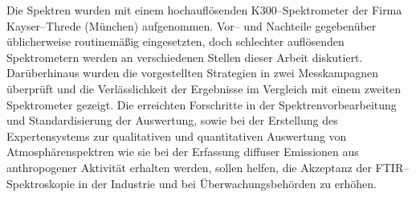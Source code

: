 Die Spektren wurden mit einem hochaufl\"{o}senden K300--Spektrometer
der Firma Kayser--Threde (M\"{u}nchen) aufgenommen. Vor-- und
Nachteile gegeben\"{u}ber \"{u}blicherweise routinem\"{a}{\ss}ig eingesetzten,
doch schlechter aufl\"{o}senden Spektrometern werden an verschiedenen
Stellen dieser Arbeit diskutiert. Dar\"{u}berhinaus wurden die
vorgestellten Strategien in zwei Messkampagnen \"{u}berpr\"{u}ft und die
Verl\"{a}sslichkeit der Ergebnisse im Vergleich mit einem zweiten
Spektrometer gezeigt. Die erreichten Forschritte in der
Spektrenvorbearbeitung und Standardisierung der Auswertung, sowie
bei der Erstellung des Expertensystems zur qualitativen und
quantitativen Auswertung von Atmosph\"{a}renspektren wie sie bei der
Erfassung diffuser Emissionen aus anthropogener Aktivit\"{a}t erhalten
werden, sollen helfen, die Akzeptanz der FTIR--Spektroskopie in
der Industrie und bei \"{U}berwachungsbeh\"{o}rden zu erh\"{o}hen.\\

\cleardoublepage
